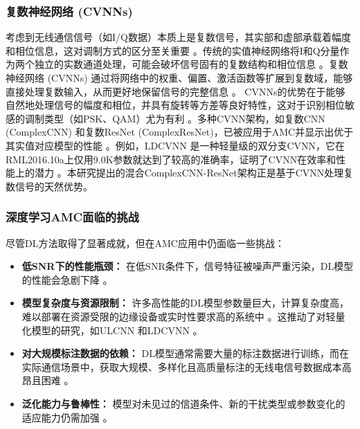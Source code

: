\documentclass[conference]{IEEEtran}
\begin{document}
\subsubsection{复数神经网络 (CVNNs)}
考虑到无线通信信号（如I/Q数据）本质上是复数信号，其实部和虚部承载着幅度和相位信息，这对调制方式的区分至关重要 \cite{b4}。传统的实值神经网络将I和Q分量作为两个独立的实数通道处理，可能会破坏信号固有的复数结构和相位信息 \cite{b4}\cite{[42_MISSING]}。复数神经网络 (CVNNs) 通过将网络中的权重、偏置、激活函数等扩展到复数域，能够直接处理复数输入，从而更好地保留信号的完整信息 \cite{b4}\cite{[43_MISSING]}\cite{[44_MISSING]}。
CVNNs的优势在于能够自然地处理信号的幅度和相位，并具有旋转等方差等良好特性，这对于识别相位敏感的调制类型（如PSK、QAM）尤为有利 \cite{b4}。多种CVNN架构，如复数CNN (ComplexCNN) 和复数ResNet (ComplexResNet)，已被应用于AMC并显示出优于其实值对应模型的性能 \cite{b4}\cite{[45_MISSING]}。例如，LDCVNN \cite{b4} 是一种轻量级的双分支CVNN，它在RML2016.10a上仅用9.0K参数就达到了较高的准确率，证明了CVNN在效率和性能上的潜力 \cite{b4}\cite{[47_MISSING]}。本研究提出的混合ComplexCNN-ResNet架构正是基于CVNN处理复数信号的天然优势。

\subsubsection{深度学习AMC面临的挑战}
尽管DL方法取得了显著成就，但在AMC应用中仍面临一些挑战：
\begin{itemize}
    \item \textbf{低SNR下的性能瓶颈：} 在低SNR条件下，信号特征被噪声严重污染，DL模型的性能会急剧下降 \cite{b1}\cite{[5]}\cite{[28_MISSING]}\cite{[29_MISSING]}\cite{[30_MISSING]}。
    \item \textbf{模型复杂度与资源限制：} 许多高性能的DL模型参数量巨大，计算复杂度高，难以部署在资源受限的边缘设备或实时性要求高的系统中 \cite{[5]}\cite{[23_MISSING]}\cite{[26_MISSING]}\cite{[28_MISSING]}\cite{[31_MISSING]}\cite{[47_MISSING]}。这推动了对轻量化模型的研究，如ULCNN \cite{b1} \cite{[23_MISSING]}\cite{b1} 和LDCVNN \cite{b4} \cite{b4}\cite{[47_MISSING]}。
    \item \textbf{对大规模标注数据的依赖：} DL模型通常需要大量的标注数据进行训练，而在实际通信场景中，获取大规模、多样化且高质量标注的无线电信号数据成本高昂且困难 \cite{[5]}\cite{[8]}\cite{[12]}\cite{[19]}\cite{[49_MISSING]}\cite{[50_MISSING]}\cite{[51_MISSING]}。
    \item \textbf{泛化能力与鲁棒性：} 模型对未见过的信道条件、新的干扰类型或参数变化的适应能力仍需加强 \cite{[5]}。
\end{itemize}
\end{document}
